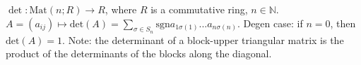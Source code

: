 $\det : \text{Mat}(n; R) \to R$,
where $R$ is a commutative ring,
$n \in \mathbb{N}$.
$A = (a_{ij}) \mapsto \text{det}(A) = \sum_{\sigma \in S_n} \text{sgn} a_{1 \sigma(1)} ... a_{n \sigma(n)}$.
Degen case: if $n = 0$, then $\text{det}(A) = 1$.
Note: the determinant of a block-upper triangular matrix
is the product of the determinants of the blocks along the diagonal.
